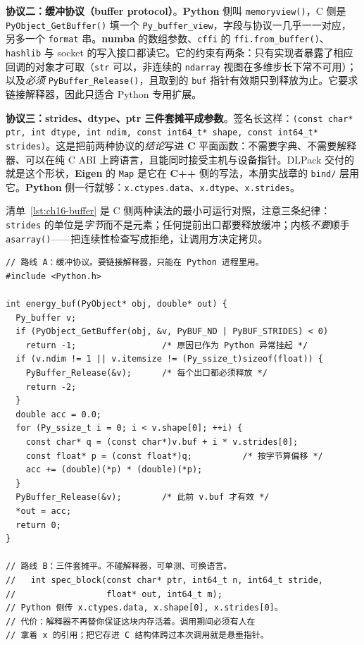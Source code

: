 \documentclass[12pt,a4paper,fontset=fandol]{ctexbook}
\newcommand{\Fn}[1]{\texttt{#1()}}
\newcommand{\Tp}[1]{\texttt{#1}}
\newcommand{\Lib}[1]{\textbf{#1}}
\newcommand{\Lang}[1]{\textsf{\bfseries #1}}
\newcommand{\CL}{\Lang{C}}
\newcommand{\CPP}{\Lang{C++}}
\newcommand{\PY}{\Lang{Python}}
\begin{document}
\textbf{协议二：缓冲协议（buffer protocol）}。\PY{} 侧叫 \Fn{memoryview}，C 侧是 \Fn{PyObject\_GetBuffer} 填一个 \Tp{Py\_buffer\_view}，字段与协议一几乎一一对应，另多一个 \Tp{format} 串。\Lib{numba} 的数组参数、\Tp{cffi} 的 \Fn{ffi.from\_buffer}、\Tp{hashlib} 与 socket 的写入接口都读它。它的约束有两条：只有实现者暴露了相应回调的对象才可取（\Tp{str} 可以，非连续的 \Tp{ndarray} 视图在多维步长下常不可用）；以及\emph{必须} \Fn{PyBuffer\_Release}，且取到的 \Tp{buf} 指针有效期只到释放为止。它要求链接解释器，因此只适合 Python 专用扩展。

\textbf{协议三：strides、dtype、ptr 三件套摊平成参数}。签名长这样：\Tp{(const char* ptr, int dtype, int ndim, const int64\_t* shape, const int64\_t* strides)}。这是把前两种协议的\emph{结论}写进 \CL{} 平面函数：不需要字典、不需要解释器、可以在纯 C ABI 上跨语言，且能同时接受主机与设备指针。DLPack 交付的就是这个形状，\Lib{Eigen} 的 \Tp{Map} 是它在 \CPP{} 侧的写法，本册实战章的 \Tp{bind/} 层用它。\PY{} 侧一行就够：\Tp{x.ctypes.data}、\Tp{x.dtype}、\Tp{x.strides}。

清单~\ref{lst:ch16-buffer} 是 C 侧两种读法的最小可运行对照，注意三条纪律：\Tp{strides} 的单位是\emph{字节}而不是元素；任何提前出口都要释放缓冲；内核\emph{不要}顺手 \Fn{asarray}——把连续性检查写成拒绝，让调用方决定拷贝。

\begin{lstlisting}[style=cstyle,caption={C 侧读 numpy 数组：缓冲协议与摊平的三件套},label={lst:ch16-buffer}]
// 路线 A：缓冲协议。要链接解释器，只能在 Python 进程里用。
#include <Python.h>

int energy_buf(PyObject* obj, double* out) {
  Py_buffer v;
  if (PyObject_GetBuffer(obj, &v, PyBUF_ND | PyBUF_STRIDES) < 0)
    return -1;                 /* 原因已作为 Python 异常挂起 */
  if (v.ndim != 1 || v.itemsize != (Py_ssize_t)sizeof(float)) {
    PyBuffer_Release(&v);      /* 每个出口都必须释放 */
    return -2;
  }
  double acc = 0.0;
  for (Py_ssize_t i = 0; i < v.shape[0]; ++i) {
    const char* q = (const char*)v.buf + i * v.strides[0];
    const float* p = (const float*)q;          /* 按字节算偏移 */
    acc += (double)(*p) * (double)(*p);
  }
  PyBuffer_Release(&v);        /* 此前 v.buf 才有效 */
  *out = acc;
  return 0;
}

// 路线 B：三件套摊平。不碰解释器，可单测、可换语言。
//   int spec_block(const char* ptr, int64_t n, int64_t stride,
//                  float* out, int64_t m);
// Python 侧传 x.ctypes.data, x.shape[0], x.strides[0]。
// 代价：解释器不再替你保证这块内存活着。调用期间必须有人在
// 拿着 x 的引用；把它存进 C 结构体跨过本次调用就是悬垂指针。
\end{lstlisting}
\end{document}
